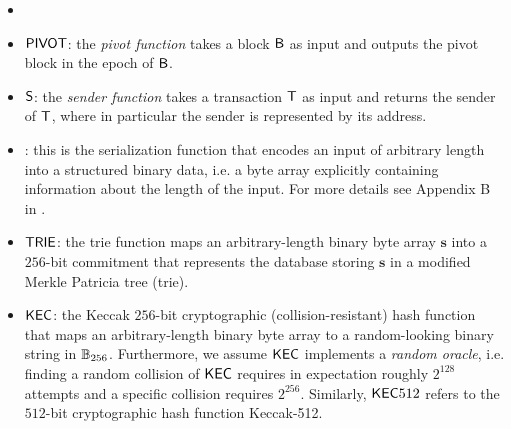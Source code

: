 \begin{itemize}[nosep]
	\item {}


	\item $\mathsf{PIVOT}$: the \emph{pivot function} takes a block $\textsf{B}$ as input and outputs the pivot block in the epoch of $\textsf{B}$.

	\item $\mathsf{S} $: the \emph{sender function} takes a transaction $\textsf{T}$ as input and returns the sender of $\textsf{T}$, where in particular the sender is represented by its address. 

	\item {}: this is the serialization function that encodes an input of arbitrary length into a structured binary data, i.e. a byte array explicitly containing information about the length of the input.
	For more details see Appendix B in \cite{ETH_yellow}.


	\item $\mathsf{TRIE}$: the trie function maps an arbitrary-length binary byte array $\mathbf{s}$ into a  $256$-bit commitment that represents the database storing $\mathbf{s}$ in a modified Merkle Patricia tree (trie). 

	\item $\mathsf{KEC}$: the Keccak $256$-bit cryptographic (collision-resistant) hash function that maps an arbitrary-length binary byte array to a random-looking binary string in $\mathbb{B}_{256}$.
	Furthermore, we assume $\mathsf{KEC}$ implements a \emph{random oracle}, i.e. finding a random collision of $\mathsf{KEC}$ requires in expectation roughly $2^{128}$ attempts and a specific collision requires $2^{256}$.
	Similarly, $\mathsf{KEC}512$ refers to the $512$-bit cryptographic hash function Keccak-512.


\end{itemize}
